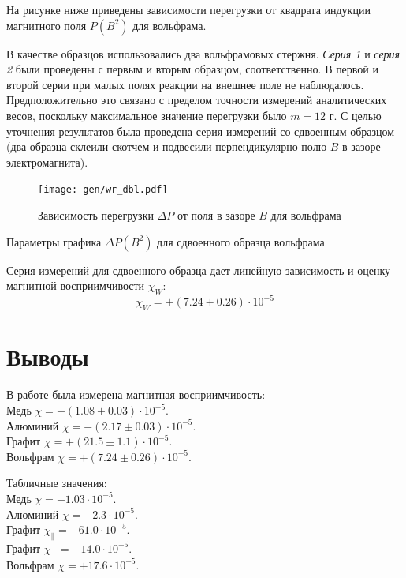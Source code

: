 \documentclass[12pt,a4paper]{article}
\begin{document}
	На рисунке ниже приведены зависимости перегрузки от квадрата индукции магнитного поля $P(B^2)$ для вольфрама.
	
	В качестве образцов использовались два вольфрамовых стержня. \textit{Серия 1} и \textit{серия 2} были проведены с первым и вторым образцом, соответственно. В первой и второй серии при малых полях реакции на внешнее поле не наблюдалось. Предположительно это связано с пределом точности измерений аналитических весов, поскольку максимальное значение перегрузки было $m = 12$ г. С целью уточнения результатов была проведена серия измерений со сдвоенным образцом (два образца склеили скотчем и подвесили перпендикулярно полю $B$ в зазоре электромагнита).
	
	\begin{figure}[H]
		\texttt{[image: gen/wr\_dbl.pdf]}
		\caption{Зависимость перегрузки $\Delta P$ от поля в зазоре $B$ для вольфрама}
	\end{figure}
	
	\begin{table}[h]
		\caption{Параметры графика $\Delta P(B^2)$ для сдвоенного образца вольфрама}
		
	\end{table}
	
	Серия измерений для сдвоенного образца дает линейную зависимость и оценку магнитной восприимчивости $\chi_W$:
	$$\chi_{W} = +(7.24 \pm 0.26) \cdot 10^{-5} $$
	
	\section*{Выводы}
	
	В работе была измерена магнитная восприимчивость: \\
	Медь $\chi = -(1.08 \pm 0.03) \cdot 10^{-5}$. \\
	Алюминий $\chi = +(2.17 \pm 0.03) \cdot 10^{-5}$. \\
	Графит $\chi = +(21.5 \pm 1.1) \cdot 10^{-5}$. \\
	Вольфрам $\chi = +(7.24 \pm 0.26) \cdot 10^{-5}$.
	
	Табличные значения: \\
	Медь $\chi = -1.03 \cdot 10^{-5}$. \\
	Алюминий $\chi = +2.3 \cdot 10^{-5}$. \\
	Графит $\chi_\parallel = -61.0 \cdot 10^{-5}$. \\
	Графит $\chi_\perp = -14.0 \cdot 10^{-5}$. \\
	Вольфрам $\chi = +17.6 \cdot 10^{-5}$.
	
\end{document}
